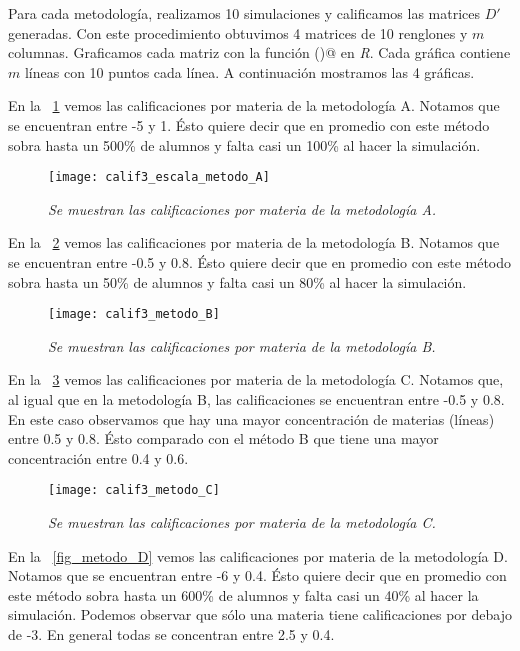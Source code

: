 Para cada metodología, realizamos 10 simulaciones y calificamos las matrices $D'$ generadas. Con este procedimiento obtuvimos 4 matrices de 10 renglones y $m$ columnas. Graficamos cada matriz con la función \verb@matplot()@ en \textit{R}. Cada gráfica contiene $m$ líneas con 10 puntos cada línea. A continuación mostramos las 4 gráficas.

En la \figurename{~\ref{fig_metodo_A}} vemos las calificaciones por materia de la metodología A. Notamos que se encuentran entre -5 y 1. Ésto quiere decir que en promedio con este método sobra hasta un 500\% de alumnos y falta casi un 100\% al hacer la simulación.

\begin{figure}[H]
\centering
\texttt{[image: calif3\_escala\_metodo\_A]} %
\caption[\textit{Metodología A}]{\textit{Se muestran las calificaciones por materia de la metodología A.}}\label{fig_metodo_A}
\end{figure} 


En la \figurename{~\ref{fig_metodo_B}} vemos las calificaciones por materia de la metodología B. Notamos que se encuentran entre -0.5 y 0.8. Ésto quiere decir que en promedio con este método sobra hasta un 50\% de alumnos y falta casi un 80\% al hacer la simulación.

\begin{figure}[H]
\centering
\texttt{[image: calif3\_metodo\_B]} %
\caption[\textit{Metodología B}]{\textit{Se muestran las calificaciones por materia de la metodología B.}}\label{fig_metodo_B}
\end{figure} 


En la \figurename{~\ref{fig_metodo_C}} vemos las calificaciones por materia de la metodología C. Notamos que, al igual que en la metodología B, las calificaciones se encuentran entre -0.5 y 0.8. En este caso observamos que hay una mayor concentración de materias (líneas) entre 0.5 y 0.8. Ésto comparado con el método B que tiene una mayor concentración entre 0.4 y 0.6.

\begin{figure}[H]
\centering
\texttt{[image: calif3\_metodo\_C]} %
\caption[\textit{Metodología C}]{\textit{Se muestran las calificaciones por materia de la metodología C.}}\label{fig_metodo_C}
\end{figure}


En la \figurename{~\ref{fig_metodo_D}} vemos las calificaciones por materia de la metodología D. Notamos que se encuentran entre -6 y 0.4. Ésto quiere decir que en promedio con este método sobra hasta un 600\% de alumnos y falta casi un 40\% al hacer la simulación. Podemos observar que sólo una materia tiene calificaciones por debajo de -3. En general todas se concentran entre 2.5 y 0.4.

